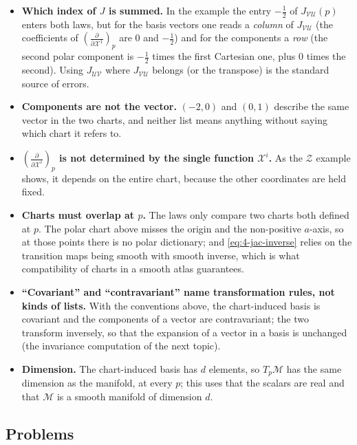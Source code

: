 \documentclass[11pt]{article}
\newcommand{\TpM}{T_p\mathcal M}
\begin{document}
\begin{itemize}
  \item \textbf{Which index of $J$ is summed.} In the example the entry $-\tfrac12$ of $J_{\mathcal{VU}}(p)$ enters both laws, but for the basis vectors one reads a \emph{column} of $J_{\mathcal{VU}}$ (the coefficients of $\left(\frac{\partial}{\partial\mathcal X^1}\right)_p$ are $0$ and $-\tfrac12$) and for the components a \emph{row} (the second polar component is $-\tfrac12$ times the first Cartesian one, plus $0$ times the second). Using $J_{\mathcal{UV}}$ where $J_{\mathcal{VU}}$ belongs (or the transpose) is the standard source of errors.
  \item \textbf{Components are not the vector.} $(-2,0)$ and $(0,1)$ describe the same vector in the two charts, and neither list means anything without saying which chart it refers to.
  \item \textbf{$\left(\frac{\partial}{\partial\mathcal X^i}\right)_p$ is not determined by the single function $\mathcal X^i$.} As the $\mathcal Z$ example shows, it depends on the entire chart, because the other coordinates are held fixed.
  \item \textbf{Charts must overlap at $p$.} The laws only compare two charts both defined at $p$. The polar chart above misses the origin and the non-positive $a$-axis, so at those points there is no polar dictionary; and \eqref{eq:4-jac-inverse} relies on the transition maps being smooth with smooth inverse, which is what compatibility of charts in a smooth atlas guarantees.
  \item \textbf{``Covariant'' and ``contravariant'' name transformation rules, not kinds of lists.} With the conventions above, the chart-induced basis is covariant and the components of a vector are contravariant; the two transform inversely, so that the expansion of a vector in a basis is unchanged (the invariance computation of the next topic).
  \item \textbf{Dimension.} The chart-induced basis has $d$ elements, so $\TpM$ has the same dimension as the manifold, at every $p$; this uses that the scalars are real and that $\mathcal M$ is a smooth manifold of dimension $d$.
\end{itemize}

\subsection*{Problems}
\end{document}
